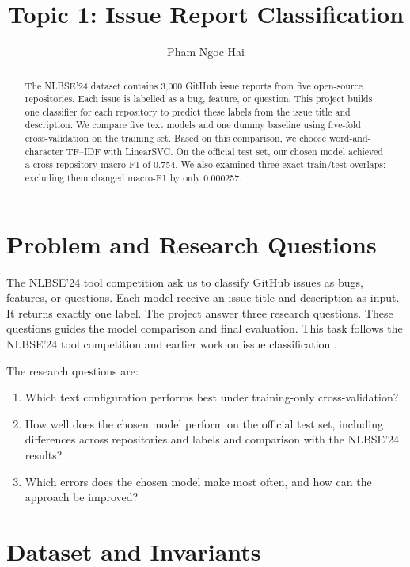 \documentclass[11pt,a4paper]{article}
\title{Topic 1: Issue Report Classification}
\author{Pham Ngoc Hai}
\date{}
\begin{document}
\maketitle

\begin{abstract}
The NLBSE'24 dataset contains 3,000 GitHub issue reports from five open-source
repositories. Each issue is labelled as a bug, feature, or question. This
project builds one classifier for each repository to predict these labels from
the issue title and description. We compare five text models and one dummy
baseline using five-fold cross-validation on the training set. Based on this
comparison, we choose word-and-character TF--IDF with LinearSVC. On the official
test set, our chosen model achieved a cross-repository macro-F1 of 0.754. We
also examined three exact train/test overlaps; excluding them changed macro-F1
by only 0.000257.
\end{abstract}

\section{Problem and Research Questions}

The NLBSE'24 tool competition ask us to classify GitHub issues as bugs, features, or questions. %
Each model receive an issue title and description as input. %
It returns exactly one label. The project answer three research questions. %
These questions guides the model comparison and final evaluation. %
This task follows the NLBSE'24 tool competition \cite{nlbse2024} and earlier
work on issue classification
\cite{kallis2020tickettagger,kallis2019tickettagger}.

The research questions are:

\begin{enumerate}
  \item Which text configuration performs best under training-only
  cross-validation?
  \item How well does the chosen model perform on the official test set,
  including differences across repositories and labels and comparison with
  the NLBSE'24 results?
  \item Which errors does the chosen model make most often, and how can the
  approach be improved?
\end{enumerate}

\section{Dataset and Invariants}
\end{document}

